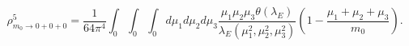 \begin{equation}
 \rho^5_{m_0\rightarrow 0+0+0}\!=\frac{1}{64\pi^4}
 \int_0\!\!\int_0\!\!\int_0 \!\!d\mu_1 d\mu_2 d\mu_3
 \frac{\mu_1\mu_2\mu_3\theta(\lambda_E)}{\lambda_E(\mu_1^2,\mu_2^2,\mu_3^2)}
 \left( 1\!-\frac{\mu_1+\mu_2+\mu_3}{m_0} \right).
\end{equation}

